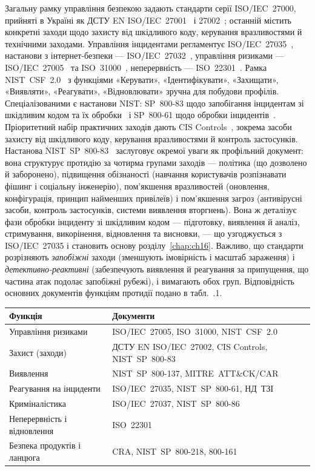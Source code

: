 Загальну рамку управління безпекою задають стандарти серії ISO/IEC~27000, прийняті в Україні як ДСТУ EN ISO/IEC~27001~\cite{dstu-27001} і 27002~\cite{dstu-27002}; останній містить конкретні заходи щодо захисту від шкідливого коду, керування вразливостями й технічними заходами. Управління інцидентами регламентує ISO/IEC~27035~\cite{iso-27035}, настанови з інтернет-безпеки --- ISO/IEC~27032~\cite{ch02:iso27032}, управління ризиками --- ISO/IEC~27005~\cite{iso-27005} та ISO~31000~\cite{iso-31000}, неперервність --- ISO~22301~\cite{iso-22301}. Рамка NIST~CSF~2.0~\cite{nist-csf2} з функціями «Керувати», «Ідентифікувати», «Захищати», «Виявляти», «Реагувати», «Відновлювати» зручна для побудови профілів. Спеціалізованими є настанови NIST: SP~800-83 щодо запобігання інцидентам зі шкідливим кодом та їх обробки~\cite{nist-83} і SP~800-61 щодо обробки інцидентів~\cite{nist-61}. Пріоритетний набір практичних заходів дають CIS Controls~\cite{ch02:cis}, зокрема засоби захисту від шкідливого коду, керування вразливостями й контроль застосунків. Настанова NIST~SP~800-83~\cite{nist-83} заслуговує окремої уваги як профільний документ: вона структурує протидію за чотирма групами заходів --- політика (що дозволено й заборонено), підвищення обізнаності (навчання користувачів розпізнавати фішинг і соціальну інженерію), пом'якшення вразливостей (оновлення, конфігурація, принцип найменших привілеїв) і пом'якшення загроз (антивірусні засоби, контроль застосунків, системи виявлення вторгнень). Вона ж деталізує фази обробки інциденту зі шкідливим кодом --- підготовку, виявлення й аналіз, стримування, викорінення, відновлення та висновки, --- що узгоджується з ISO/IEC~27035 і становить основу розділу~\ref{chap:ch16}. Важливо, що стандарти розрізняють \emph{запобіжні} заходи (зменшують імовірність і масштаб зараження) і \emph{детективно-реактивні} (забезпечують виявлення й реагування за припущення, що частина атак подолає запобіжні рубежі), і вимагають обох груп. Відповідність основних документів функціям протидії подано в табл.~\thechapter.1.


\begin{center}\footnotesize
\begin{tabularx}{\linewidth}{L{26mm} Y}
\toprule
Функція & Документи \\
\midrule
Управління ризиками & ISO/IEC~27005, ISO~31000, NIST~CSF~2.0 \\
Захист (заходи) & ДСТУ EN ISO/IEC~27002, CIS Controls, NIST~SP~800-83 \\
Виявлення & NIST~SP~800-137, MITRE~ATT\&CK/CAR \\
Реагування на інциденти & ISO/IEC~27035, NIST~SP~800-61, НД~ТЗІ \\
Криміналістика & ISO/IEC~27037, NIST~SP~800-86 \\
Неперервність і відновлення & ISO~22301 \\
Безпека продуктів і ланцюга & CRA, NIST~SP~800-218, 800-161 \\
\bottomrule
\end{tabularx}
\end{center}

